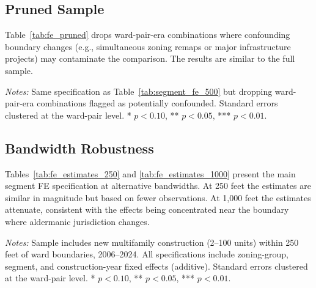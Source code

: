 \subsection{Pruned Sample}

Table~\ref{tab:fe_pruned} drops ward-pair-era combinations where confounding boundary changes (e.g., simultaneous zoning remaps or major infrastructure projects) may contaminate the comparison. The results are similar to the full sample.

\begin{table}[H]
    \caption{Effect of Aldermanic Strictness on Development Density (Pruned Sample)}
    \label{tab:fe_pruned}

    

    \footnotesize
    \textit{Notes:} Same specification as Table~\ref{tab:segment_fe_500} but dropping ward-pair-era combinations flagged as potentially confounded. Standard errors clustered at the ward-pair level. * $p<0.10$, ** $p<0.05$, *** $p<0.01$.
\end{table}

\subsection{Bandwidth Robustness}

Tables~\ref{tab:fe_estimates_250} and \ref{tab:fe_estimates_1000} present the main segment FE specification at alternative bandwidths. At 250 feet the estimates are similar in magnitude but based on fewer observations. At 1,000 feet the estimates attenuate, consistent with the effects being concentrated near the boundary where aldermanic jurisdiction changes.

\begin{table}[H]
    \caption{Effect of Aldermanic Strictness on Development Density (250 ft Bandwidth)}
    \label{tab:fe_estimates_250}

    

    \footnotesize
    \textit{Notes:} Sample includes new multifamily construction (2--100 units) within 250 feet of ward boundaries, 2006--2024. All specifications include zoning-group, segment, and construction-year fixed effects (additive). Standard errors clustered at the ward-pair level. * $p<0.10$, ** $p<0.05$, *** $p<0.01$.
\end{table}

